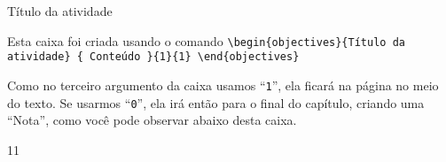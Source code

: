 




\def\currentcolor{session1}
\begin{objectives}{Título da atividade}
{Esta caixa foi criada usando o comando 
\texttt{\textbackslash begin\{objectives\}\{Título da atividade\}\newline
\{\newline
Conteúdo\newline
\}\{1\}\{1\}\newline
\textbackslash end\{objectives\}
}


Como no terceiro argumento da caixa usamos ``\texttt{1}'', ela ficará na página no meio do texto. Se usarmos ``\texttt{0}'', ela irá então para o final do capítulo, criando uma ``Nota'', como você pode observar abaixo desta caixa.
}{1}{1}
\end{objectives}


